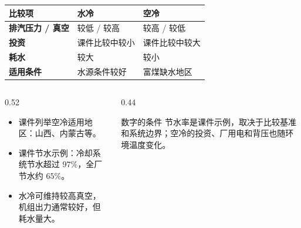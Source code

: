 \begin{frame}[t,shrink]{}
\begin{smalltab}
\begin{tabularx}{\linewidth}{@{}>{\bfseries}p{30mm}XX@{}}
  \toprule
  比较项 & 水冷 & 空冷\\
  \midrule
  排汽压力 / 真空 & 较低 / 较高 & 较高 / 较低\\
  投资 & 课件比较中较小 & 课件比较中较大\\
  耗水 & 较大 & 较小\\
  适用条件 & 水源条件较好 & 富煤缺水地区\\
  \bottomrule
\end{tabularx}
\end{smalltab}
\begin{columns}[T,onlytextwidth]
\begin{column}{0.52\textwidth}
  \begin{itemize}
    \item 课件列举空冷适用地区：山西、内蒙古等。
    \item 课件节水示例：冷却系统节水超过 \(97\%\)，全厂节水约 \(65\%\)。
    \item 水冷可维持较高真空，机组出力通常较好，但耗水量大。
  \end{itemize}
\end{column}
\begin{column}{0.44\textwidth}
  \begin{amberbox}{数字的条件}
  \small 节水率是课件示例，取决于比较基准和系统边界；空冷的投资、厂用电和背压也随环境温度变化。
  \end{amberbox}
\end{column}
\end{columns}
\end{frame}
